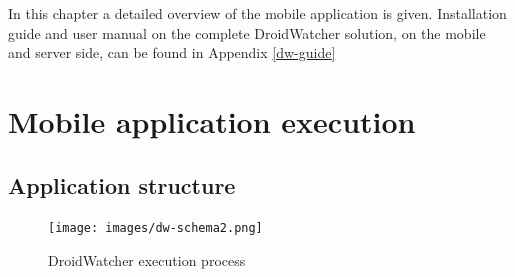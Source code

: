 In this chapter a detailed overview of the mobile application is given.
Installation guide and user manual on the complete DroidWatcher solution, on the mobile and server side, can be found in Appendix \ref{dw-guide}




\section{Mobile application execution}

\subsection{Application structure}
\label{sec:dw-app-structure}

\begin{figure}[h]
  \centering
  \texttt{[image: images/dw-schema2.png]}
  \caption{DroidWatcher execution process}
  \label{fig:dw-schema}
\end{figure}

